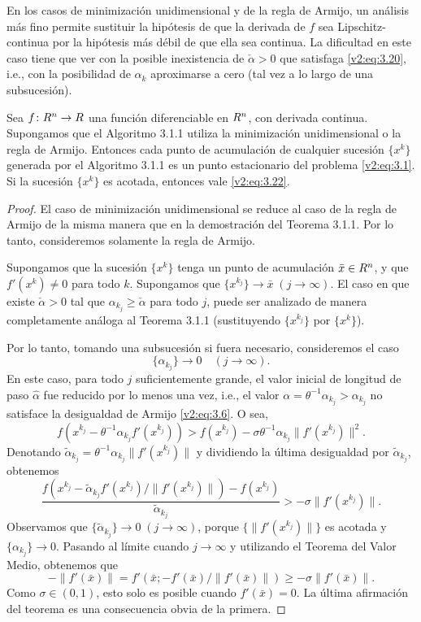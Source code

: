 En los casos de minimización unidimensional y de la regla de Armijo, un análisis más fino permite sustituir la hipótesis de que la derivada de $f$ sea Lipschitz-continua por la hipótesis más débil de que ella sea continua. La dificultad en este caso tiene que ver con la posible inexistencia de $\check{\alpha} > 0$ que satisfaga \eqref{v2:eq:3.20}, i.e., con la posibilidad de $\alpha_k$ aproximarse a cero (tal vez a lo largo de una subsucesión).

\begin{theorem}\label{v2:thm:3.1.2}
    Sea $f \colon R^n \to R$ una función diferenciable en $R^n$, con derivada continua. Supongamos que el Algoritmo 3.1.1 utiliza la minimización unidimensional o la regla de Armijo.
    Entonces cada punto de acumulación de cualquier sucesión $\{x^k\}$ generada por el Algoritmo 3.1.1 es un punto estacionario del problema \eqref{v2:eq:3.1}. Si la sucesión $\{x^k\}$ es acotada, entonces vale \eqref{v2:eq:3.22}.
\end{theorem}
\begin{proof}
    El caso de minimización unidimensional se reduce al caso de la regla de Armijo de la misma manera que en la demostración del Teorema 3.1.1. Por lo tanto, consideremos solamente la regla de Armijo.

    Supongamos que la sucesión $\{x^k\}$ tenga un punto de acumulación $\bar{x} \in R^n$, y que $f'(x^k) \neq 0$ para todo $k$. Supongamos que $\{x^{k_j}\} \to \bar{x} \; (j \to \infty)$. El caso en que existe $\check{\alpha} > 0$ tal que $\alpha_{k_j} \ge \check{\alpha}$ para todo $j$, puede ser analizado de manera completamente análoga al Teorema 3.1.1 (sustituyendo $\{x^{k_j}\}$ por $\{x^k\}$).

    Por lo tanto, tomando una subsucesión si fuera necesario, consideremos el caso
    \[
        \{\alpha_{k_j}\} \to 0 \quad (j \to \infty).
    \]
    En este caso, para todo $j$ suficientemente grande, el valor inicial de longitud de paso $\hat{\alpha}$ fue reducido por lo menos una vez, i.e., el valor $\alpha = \theta^{-1}\alpha_{k_j} > \alpha_{k_j}$ no satisface la desigualdad de Armijo \eqref{v2:eq:3.6}. O sea,
    \[
        f(x^{k_j} - \theta^{-1}\alpha_{k_j} f'(x^{k_j})) > f(x^{k_j}) - \sigma \theta^{-1}\alpha_{k_j} \|f'(x^{k_j})\|^2.
    \]
    Denotando $\tilde{\alpha}_{k_j} = \theta^{-1}\alpha_{k_j}\|f'(x^{k_j})\|$ y dividiendo la última desigualdad por $\tilde{\alpha}_{k_j}$, obtenemos
    \[
        \frac{f(x^{k_j} - \tilde{\alpha}_{k_j} f'(x^{k_j})/\|f'(x^{k_j})\|) - f(x^{k_j})}{\tilde{\alpha}_{k_j}} > -\sigma \|f'(x^{k_j})\|.
    \]
    Observamos que $\{\tilde{\alpha}_{k_j}\} \to 0 \; (j \to \infty)$, porque $\{\|f'(x^{k_j})\|\}$ es acotada y $\{\alpha_{k_j}\} \to 0$. Pasando al límite cuando $j \to \infty$ y utilizando el Teorema del Valor Medio, obtenemos que
    \[
        -\|f'(\bar{x})\| = f'(\bar{x}; -f'(\bar{x})/\|f'(\bar{x})\|) \ge -\sigma \|f'(\bar{x})\|.
    \]
    Como $\sigma \in (0, 1)$, esto solo es posible cuando $f'(\bar{x}) = 0$.
    La última afirmación del teorema es una consecuencia obvia de la primera.
\end{proof}

